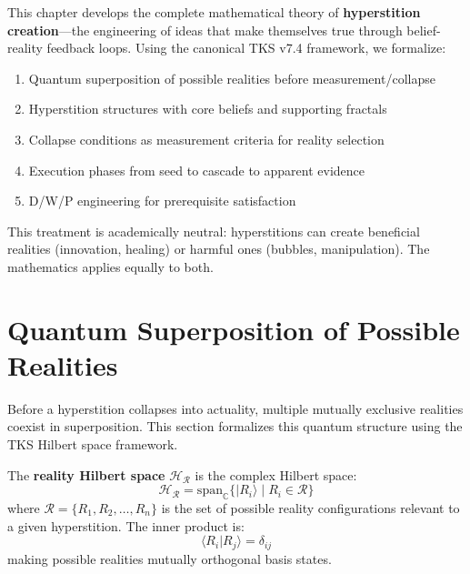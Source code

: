\begin{tcolorbox}[colback=blue!5!white,colframe=blue!75!black,title=\textbf{Chapter Overview}]
This chapter develops the complete mathematical theory of \textbf{hyperstition creation}---the engineering of ideas that make themselves true through belief-reality feedback loops. Using the canonical TKS v7.4 framework, we formalize:
\begin{enumerate}
    \item Quantum superposition of possible realities before measurement/collapse
    \item Hyperstition structures with core beliefs and supporting fractals
    \item Collapse conditions as measurement criteria for reality selection
    \item Execution phases from seed to cascade to apparent evidence
    \item D/W/P engineering for prerequisite satisfaction
\end{enumerate}
This treatment is academically neutral: hyperstitions can create beneficial realities (innovation, healing) or harmful ones (bubbles, manipulation). The mathematics applies equally to both.
\end{tcolorbox}

\section{Quantum Superposition of Possible Realities}
\label{sec:quantum-superposition-realities}

Before a hyperstition collapses into actuality, multiple mutually exclusive realities coexist in superposition. This section formalizes this quantum structure using the TKS Hilbert space framework.

\begin{definition}
\label{def:reality-hilbert}
The \textbf{reality Hilbert space} $\mathcal{H}_{\mathcal{R}}$ is the complex Hilbert space:
\[
\mathcal{H}_{\mathcal{R}} = \mathrm{span}_{\mathbb{C}}\{|R_i\rangle \mid R_i \in \mathcal{R}\}
\]
where $\mathcal{R} = \{R_1, R_2, \ldots, R_n\}$ is the set of possible reality configurations relevant to a given hyperstition. The inner product is:
\[
\langle R_i | R_j \rangle = \delta_{ij}
\]
making possible realities mutually orthogonal basis states.
\end{definition}

